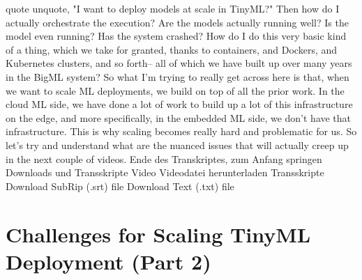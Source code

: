{{{{{    quote unquote, "I want to deploy models at scale in TinyML?"
    Then how do I actually orchestrate the execution?
    Are the models actually running well?
    Is the model even running?
    Has the system crashed?
    How do I do this very basic kind of a thing, which
    we take for granted, thanks to containers, and Dockers, and Kubernetes
    clusters, and so forth-- all of which we have built up
    over many years in the BigML system?
    So what I'm trying to really get across here
    is that, when we want to scale ML deployments,
    we build on top of all the prior work.
    In the cloud ML side, we have done a lot of work
    to build up a lot of this infrastructure on the edge, and more specifically,
    in the embedded ML side, we don't have that infrastructure.
    This is why scaling becomes really hard and problematic for us.
    So let's try and understand what are the nuanced issues that will actually
    creep up in the next couple of videos.
    Ende des Transkriptes, zum Anfang springen
    Downloads und Transskripte
    Video
    Videodatei herunterladen
    Transskripte
    Download SubRip (.srt) file
    Download Text (.txt) file    
    
 \section{Challenges for Scaling TinyML Deployment (Part 2)}
 
}}}}}
